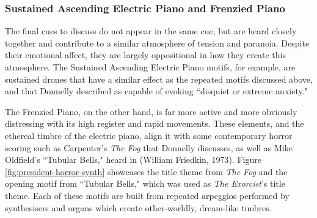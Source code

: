 \subsubsection{Sustained Ascending Electric Piano and Frenzied Piano}

The final cues to discuss do not appear in the same cue, but are heard closely together and contribute to a similar atmosphere of tension and paranoia.
Despite their emotional affect, they are largely oppositional in how they create this atmosphere.
The Sustained Ascending Electric Piano motifs, for example, are sustained drones that have a similar effect as the repeated motifs discussed above, and that Donnelly described as capable of evoking ``disquiet or extreme anxiety."\autocites[][161]{donnelly_hearing_2010}

The Frenzied Piano, on the other hand, is far more active and more obviously distressing with its high register and rapid movements.
These elements, and the ethereal timbre of the electric piano, align it with some contemporary horror scoring such as Carpenter's \textit{The Fog} that Donnelly discusses, as well as Mike Oldfield's ``Tubular Bells," heard in  (William Friedkin, 1973).
Figure \ref{fig:president-horror-synth} showcases the title theme from \textit{The Fog} and the opening motif from ``Tubular Bells," which was used as \textit{The Exorcist}'s title theme.
Each of these motifs are built from repeated arpeggios performed by synthesisers and organs which create other-worldly, dream-like timbres.\autocites[On``Tubular Bells," Mike Oldfield utilised pianos, and multiple reed and electronic organs. As Donnelly notes, there is no official record of which specific synthesiser Carpenter used on his score for \textit{The Fog}. Donnelly surmises that it was likely a Moog Series 3.][159-160]{donnelly_hearing_2010}

